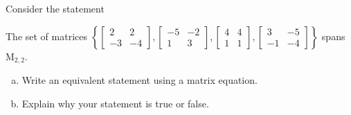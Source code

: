 
\begin{exerciseStatement}


Consider the statement 
\begin{center}\begin{minipage}{0.8\textwidth}
 The set of matrices \( \left\{ \left[\begin{array}{cc}
2 & 2 \\
-3 & -4
\end{array}\right] , \left[\begin{array}{cc}
-5 & -2 \\
1 & 3
\end{array}\right] , \left[\begin{array}{cc}
4 & 4 \\
1 & 1
\end{array}\right] , \left[\begin{array}{cc}
3 & -5 \\
-1 & -4
\end{array}\right] \right\} \) spans \(\mathrm{M}_{2,2}\). 
\end{minipage}\end{center}
    


\begin{enumerate}[(a)]
\item  Write an equivalent statement using a matrix equation.
\item  Explain why your statement is true or false.
\end{enumerate}
    
\end{exerciseStatement}
    
